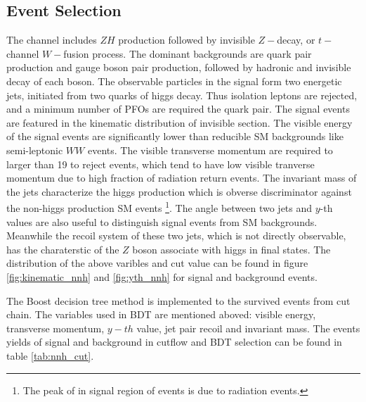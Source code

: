 \subsection{\nnh Event Selection}
The \nnh channel includes $ZH$ production followed by invisible $Z-$decay, or $t-$channel $W-$fusion process. 
The dominant backgrounds are quark pair production and gauge boson pair production, followed by hadronic and invisible decay of each boson. 
The observable particles in the signal form two energetic jets, initiated from two quarks of higgs decay. 
Thus isolation leptons are rejected, and a minimum number of PFOs are required the quark pair. 
The signal events are featured in the kinematic distribution of invisible section.  
The visible energy of the signal events are significantly lower than reducible SM backgrounds like semi-leptonic $WW$ events. 
The visible transverse momentum are required to larger than 19 \GeV to reject \qq events, which tend to have low visible tranverse momentum due to 
high fraction of radiation return events.
The invariant mass of the jets characterize the higgs production which is obverse discriminator against the non-higgs production SM events
\footnote{The peak of in signal region of \qq events is due to radiation events.}.
The angle between two jets and $y$-th values are also useful to distinguish signal events from SM backgrounds.  
Meanwhile the recoil system of these two jets, which is not directly observable, has the charaterstic of the $Z$ boson associate with higgs in final states. The distribution of the above varibles and cut value can be found in figure \ref{fig:kinematic_nnh} and \ref{fig:yth_nnh} for signal and background events. \par

The Boost decision tree \cite{BDT} method is implemented to the survived events from cut chain. The variables used 
in BDT are mentioned aboved: visible energy,  transverse momentum, $y-th$ value, jet pair recoil and invariant mass. 
The events yields of signal and background in cutflow and BDT selection can be found in table \ref{tab:nnh_cut}. \par


